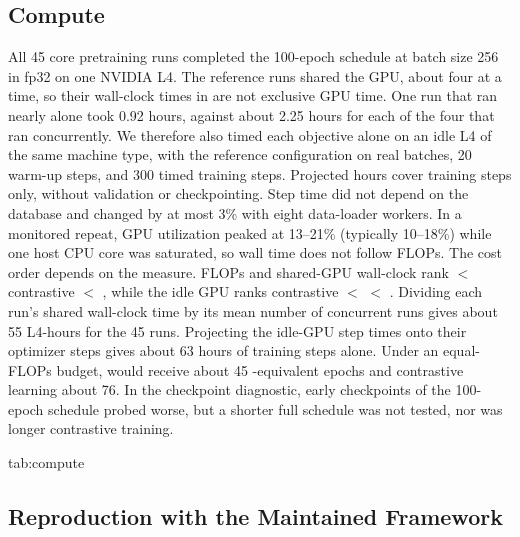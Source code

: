 \subsection{Compute}
\label{app:compute}

All 45 core pretraining runs completed the 100-epoch schedule at batch size 256 in fp32 on one NVIDIA L4. The reference runs shared the GPU, about four at a time, so their wall-clock times in  are not exclusive GPU time. One \MAE{} \MIMIC{} run that ran nearly alone took 0.92 hours, against about 2.25 hours for each of the four that ran concurrently. We therefore also timed each objective alone on an idle L4 of the same machine type, with the reference configuration on real \MIMIC{} batches, 20 warm-up steps, and 300 timed training steps. Projected hours cover training steps only, without validation or checkpointing. Step time did not depend on the database and changed by at most 3\% with eight data-loader workers. In a monitored repeat, GPU utilization peaked at 13--21\% (typically 10--18\%) while one host CPU core was saturated, so wall time does not follow FLOPs. The cost order depends on the measure. FLOPs and shared-GPU wall-clock rank \MAE{} $<$ contrastive $<$ \JEPA{}, while the idle GPU ranks contrastive $<$ \MAE{} $<$ \JEPA{}. Dividing each run's shared wall-clock time by its mean number of concurrent runs gives about 55 L4-hours for the 45 runs. Projecting the idle-GPU step times onto their optimizer steps gives about 63 hours of training steps alone. Under an equal-FLOPs budget, \JEPA{} would receive about 45 \MAE{}-equivalent epochs and contrastive learning about 76. In the checkpoint diagnostic, early \JEPA{} checkpoints of the 100-epoch schedule probed worse, but a shorter full schedule was not tested, nor was longer contrastive training.

\begin{table}[htbp]
\floatconts
  {tab:compute}
  {\caption{Pretraining cost per objective. FLOPs are forward FLOPs per sample. Wall-clock hours are W\&B runtimes on a shared L4, mean (sample SD) over five seeds. Idle-GPU columns time training steps alone on an idle L4 and project them to the 100-epoch schedule. The \JEPA{} EMA target copy is not trainable.}}
  {\scriptsize
  }
\end{table}

\subsection{Reproduction with the Maintained Framework}
\label{app:reproduction}

